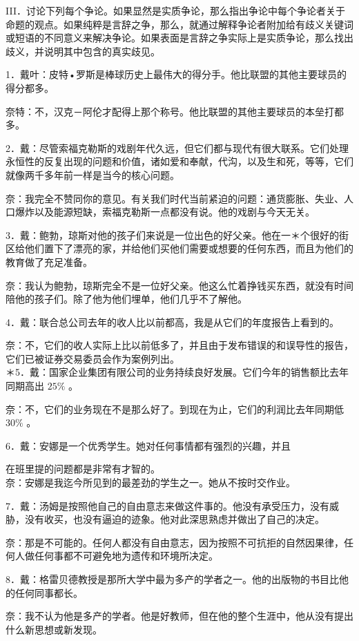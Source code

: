 III．讨论下列每个争论。如果显然是实质争论，那么指出争论中每个争论者关于命题的观点。如果纯粹是言辞之争，那么，就通过解释争论者附加给有歧义关键词或短语的不同意义来解决争论。如果表面是言辞之争实际上是实质争论，那么找出歧义，并说明其中包含的真实歧见。

1．戴叶：皮特•罗斯是棒球历史上最伟大的得分手。他比联盟的其他主要球员的得分都多。

奈特：不，汉克－阿伦才配得上那个称号。他比联盟的其他主要球员的本垒打都多。

2．戴：尽管索福克勒斯的戏剧年代久远，但它们都与现代有很大联系。它们处理永恒性的反复出现的问题和价值，诸如爱和奉献，代沟，以及生和死，等等，它们就像两千多年前一样是当今的核心问题。

奈：我完全不赞同你的意见。有关我们时代当前紧迫的问题：通货膨胀、失业、人口爆炸以及能源短缺，索福克勒斯一点都没有说。他的戏剧与今天无关。

3．戴：鲍勃，琼斯对他的孩子们来说是一位出色的好父亲。他在一＊个很好的街区给他们置下了漂亮的家，并给他们买他们需要或想要的任何东西，而且为他们的教育做了充足准备。

奈：我认为鲍勃，琼斯完全不是一位好父亲。他这么忙着挣钱买东西，就没有时间陪他的孩子们。除了他为他们埋单，他们几乎不了解他。

4．戴：联合总公司去年的收人比以前都高，我是从它们的年度报告上看到的。

奈：不，它们的收人实际上比以前低多了，并且由于发布错误的和误导性的报告，它们已被证券交易委员会作为案例列出。\\
＊5．戴：国家企业集团有限公司的业务持续良好发展。它们今年的销售额比去年同期高出 $25 \%$ 。

奈：不，它们的业务现在不是那么好了。到现在为止，它们的利润比去年同期低 $30 \%$ 。

6．戴：安娜是一个优秀学生。她对任何事情都有强烈的兴趣，并且

在班里提的问题都是非常有才智的。\\
奈：安娜是我迄今所见到的最差劲的学生之一。她从不按时交作业。

7．戴：汤姆是按照他自己的自由意志来做这件事的。他没有承受压力，没有威胁，没有收买，也没有逼迫的迹象。他对此深思熟虑并做出了自己的决定。

奈：那是不可能的。任何人都没有自由意志，因为按照不可抗拒的自然因果律，任何人做任何事都不可避免地为遗传和环境所决定。

8．戴：格雷贝德教授是那所大学中最为多产的学者之一。他的出版物的书目比他的任何同事都长。

奈：我不认为他是多产的学者。他是好教师，但在他的整个生涯中，他从没有提出什么新思想或新发现。

